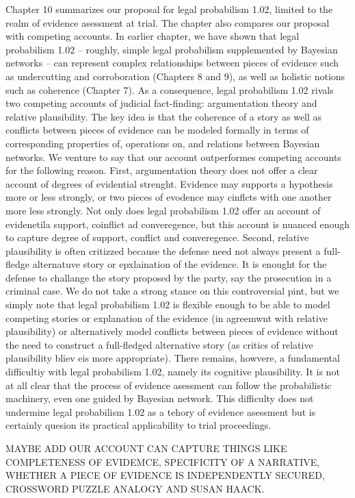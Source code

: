\documentclass[10pt,dvipsnames,enabledeprecatedfontcommands]{scrartcl}
\begin{document}
Chapter 10 summarizes our proposal for legal probabilism 1.02, limited
to the realm of evidence asessment at trial. The chapter also compares
our proposal with competing accounts. In earlier chapter, we have shown
that legal probabilism 1.02 -- roughly, simple legal probabilism
supplemented by Bayesian networks -- can represent complex relationships
between pieces of evidence such as undercutting and corroboration
(Chapters 8 and 9), as well as holistic notions such as coherence
(Chapter 7). As a consequence, legal probabilism 1.02 rivals two
competing accounts of judicial fact-finding: argumentation theory and
relative plausibility. The key idea is that the coherence of a story as
well as conflicts between pieces of evidence can be modeled formally in
terms of corresponding properties of, operations on, and relations
between Bayesian networks. We venture to say that our account
outperformes competing accounts for the following reason. First,
argumentation theory does not offer a clear account of degrees of
evidential strenght. Evidence may supports a hypothesis more or less
strongly, or two pieces of evodence may cinflcts with one another more
less strongly. Not only does legal probabilism 1.02 offer an account of
evidenetila support, coinflict ad converegence, but this account is
nuanced enough to capture degree of support, conflict and converegence.
Second, relative plausibility is often critizzed because the defense
need not always present a full-fledge alternatuve story or epxlaination
of the evidence. It is enought for the defense to challange the story
proposed by the party, say the prosecution in a criminal case. We do not
take a strong stance on this controversial pint, but we simply note that
legal probabilism 1.02 is flexible enough to be able to model competing
stories or explanation of the evidence (in agreemwnt with relative
plausibility) or alternatively model conflicts between pieces of
evidence without the need to construct a full-fledged alternative story
(as critics of relative plausibility bliev eis more appropriate). There
remains, howvere, a fundamental difficultiy with legal probabilism 1.02,
namely its cognitive plausibility. It is not at all clear that the
process of evidence asessment can follow the probabilistic machinery,
even one guided by Bayesian network. This difficulty does not undermine
legal probabilism 1.02 as a tehory of evidence asessment but is
certainly quesion its practical applicability to trial proceedings.

MAYBE ADD OUR ACCOUNT CAN CAPTURE THINGS LIKE COMPLETENESS OF EVIDEMCE,
SPECIFICITY OF A NARRATIVE, WHETHER A PIECE OF EVIDENCE IS INDEPENDENTLY
SECURED, CROSSWORD PUZZLE ANALOGY AND SUSAN HAACK.
\end{document}
